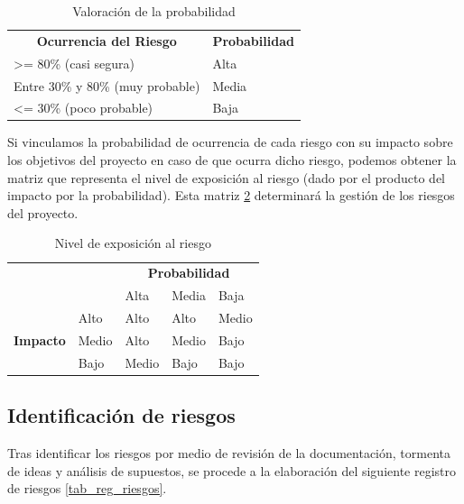\begin{table}[htpb]
\centering
\begin{tabular}{|l|l|}
\hline
\rowcolor[gray]{0.9}\multicolumn{2}{|c|}{\textbf{Valoración de la probabilidad}} \\ \hline
\multicolumn{1}{|c|}{\textbf{Ocurrencia del Riesgo}}             & \multicolumn{1}{c|}{\textbf{Probabilidad}}  \\ \hline
\textgreater= 80\% (casi segura)  & Alta          \\ \hline
Entre 30\% y 80\% (muy probable)  & Media         \\ \hline
\textless= 30\% (poco probable)   & Baja         \\ \hline
\end{tabular}
\caption{Valoración de la probabilidad}
\label{tab_probabilidad}
\end{table}

Si vinculamos la probabilidad de ocurrencia de cada riesgo con su impacto sobre los objetivos del proyecto en caso de que ocurra dicho riesgo, podemos obtener la matriz que representa el nivel de exposición al riesgo (dado por el producto del impacto por la probabilidad). Esta matriz \ref{tab_riesgo} determinará la gestión de los riesgos del proyecto.

\begin{table}[htpb]
\centering
\begin{tabular}{|l|l|l|l|l|}
\hline
\rowcolor[gray]{0.9}\multicolumn{5}{|c|}{\textbf{Nivel de exposición al riesgo}}                         \\ \hline
\multicolumn{2}{|l|}{\multirow{2}{*}{}} & \multicolumn{3}{c|}{\textbf{Probabilidad}} \\ \cline{3-5} 
\multicolumn{2}{|l|}{}                  & Alta      & Media     & Baja      \\ \hline
\multirow{3}{*}{\textbf{Impacto}}     & Alto     & Alto      & Alto      & Medio     \\ \cline{2-5} 
                             & Medio    & Alto      & Medio     & Bajo      \\ \cline{2-5} 
                             & Bajo     & Medio     & Bajo      & Bajo      \\ \hline
\end{tabular}
\caption{Nivel de exposición al riesgo}
\label{tab_riesgo}
\end{table}

\subsection{Identificación de riesgos}
Tras identificar los riesgos por medio  de revisión de la documentación, tormenta de ideas y análisis de supuestos, se procede a la elaboración del siguiente registro de riesgos \ref{tab_reg_riesgos}.

